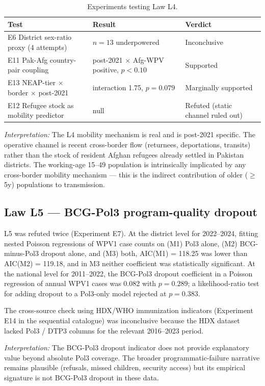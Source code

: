 \documentclass[11pt]{article}
\begin{document}
\begin{table}[h]
\centering
\small
\begin{tabular}{lll}
\toprule
Test & Result & Verdict \\
\midrule
E6 District sex-ratio proxy (4 attempts) & $n{=}13$ underpowered & Inconclusive \\
E11 Pak-Afg country-pair coupling & post-2021 $\times$ Afg-WPV positive, $p<0.10$ & Supported \\
E13 NEAP-tier $\times$ border $\times$ post-2021 & interaction 1.75, $p{=}0.079$ & Marginally supported \\
E12 Refugee stock as mobility predictor & null & Refuted (static channel ruled out) \\
\bottomrule
\end{tabular}
\caption{Experiments testing Law L4.}
\end{table}

\textit{Interpretation:} The L4 mobility mechanism is real and is post-2021 specific. The operative channel is recent cross-border flow (returnees, deportations, transits) rather than the stock of resident Afghan refugees already settled in Pakistan districts. The working-age 15--49 population is intrinsically implicated by any cross-border mobility mechanism --- this is the indirect contribution of older ($\geq$5y) populations to transmission.

\subsection{Law L5 --- BCG-Pol3 program-quality dropout}

L5 was refuted twice (Experiment E7). At the district level for 2022--2024, fitting nested Poisson regressions of WPV1 case counts on (M1) Pol3 alone, (M2) BCG-minus-Pol3 dropout alone, and (M3) both, AIC(M1) = 118.25 was lower than AIC(M2) = 119.18, and in M3 neither coefficient was statistically significant. At the national level for 2011--2022, the BCG-Pol3 dropout coefficient in a Poisson regression of annual WPV1 cases was 0.082 with $p{=}0.289$; a likelihood-ratio test for adding dropout to a Pol3-only model rejected at $p{=}0.383$.

The cross-source check using HDX/WHO immunization indicators (Experiment E14 in the sequential catalogue) was inconclusive because the HDX dataset lacked Pol3 / DTP3 columns for the relevant 2016--2023 period.

\textit{Interpretation:} The BCG-Pol3 dropout indicator does not provide explanatory value beyond absolute Pol3 coverage. The broader programmatic-failure narrative remains plausible (refusals, missed children, security access) but its empirical signature is not BCG-Pol3 dropout in these data.
\end{document}
